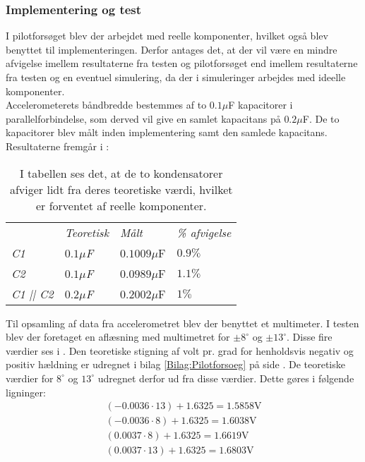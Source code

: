 \subsubsection{Implementering og test}
I pilotforsøget blev der arbejdet med reelle komponenter, hvilket også blev benyttet til implementeringen. Derfor antages det, at der vil være en mindre afvigelse imellem resultaterne fra testen og pilotforsøget end imellem resultaterne fra testen og en eventuel simulering, da der i simuleringer arbejdes med ideelle komponenter.\\
Accelerometerets båndbredde bestemmes af to $0.1\mu$F kapacitorer i parallelforbindelse, som derved vil give en samlet kapacitans på  $0.2\mu$F. De to kapacitorer blev målt inden implementering samt den samlede kapacitans. Resultaterne fremgår i  :
\begin{table}[H]
	\centering
	\begin{tabular}{llll}
		& \textit{Teoretisk} & \textit{Målt} & \textit{\% afvigelse} \\
		\textit{C1}       & \textit{$0.1\mu$F} & $0.1009\mu$F  & $0.9\%$               \\
		\textit{C2}       & \textit{$0.1\mu$F} & $0.0989\mu$F  & $1.1\%$               \\
		\textit{C1 || C2} & \textit{$0.2\mu$F} & $0.2002\mu$F  & $1\%$                
	\end{tabular}
		\caption{I tabellen ses det, at de to kondensatorer afviger lidt fra deres teoretiske værdi, hvilket er forventet af reelle komponenter.}
		\label{Tab:Acc_kondensator}
\end{table}
Til opsamling af data fra accelerometret blev der benyttet et multimeter. I testen blev der foretaget en aflæsning med multimetret for $\pm8^\circ$ og $\pm13^\circ$. Disse fire værdier ses i . Den teoretiske stigning af volt pr. grad for henholdsvis negativ og positiv hældning er udregnet i bilag \ref{Bilag:Pilotforsoeg} på side \pageref{Bilag:Pilotforsoeg}. De teoretiske værdier for $8^\circ$ og $13^\circ$ udregnet derfor ud fra disse værdier. Dette gøres i følgende ligninger:
\begin{align}
(-0.0036 \cdot 13) + 1.6325 = 1.5858\text{V} \\
(-0.0036 \cdot 8) + 1.6325 = 1.6038\text{V}  \\
(0.0037 \cdot 8) + 1.6325 = 1.6619\text{V}  \\
(0.0037 \cdot 13) + 1.6325 = 1.6803\text{V}
\end{align}
